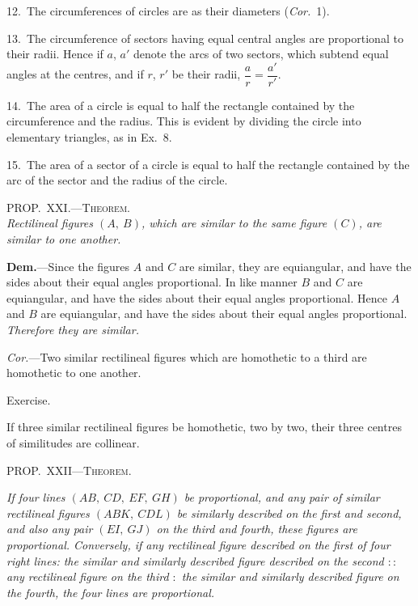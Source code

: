 \documentclass[oneside]{book}
\newcommand\myprop[2]{
\bigskip\Needspace*{4\baselineskip}\begin{center}\textsc{#1}\\\medskip\emph{#2}\par\end{center}
}
\newcommand\mypropl[2]{
\bigskip\Needspace*{4\baselineskip}\begin{center}\textsc{#1}\end{center}
\hspace{\parindent}\emph{#2}\par\medskip
}
\newcommand\exhead[1]{
\Needspace*{5\baselineskip}\begin{center}
\textsf{#1}
\end{center}
}
\newcommand\imgcent[2]{
\begin{center}
\end{center}
}
\begin{document}
\begin{footnotesize}
12.~The circumferences of circles are as their diameters
(\textit{Cor.}~1).

13.~The circumference of sectors having equal central angles
are proportional to their radii. Hence if $a$, $a'$ denote the arcs of
two sectors, which subtend equal angles at the centres, and if
$r$, $r'$ be their radii, $\dfrac{a}{r} = \dfrac{a'}{r'}$.

14.~The area of a circle is equal to half the rectangle contained
by the circumference and the radius. This is evident by
dividing the circle into elementary triangles, as in Ex.~8.

15.~The area of a sector of a circle is equal to half the rectangle
contained by the arc of the sector and the radius of the
circle.
\par\end{footnotesize}

\myprop{PROP\@.~XXI\@.---Theorem.}{Rectilineal figures $(A,\ B)$, which are similar to the same
figure $(C)$, are similar to one another.}

\textbf{Dem.}---Since the figures $A$ and $C$ are similar, they
are equiangular, and have the sides about their equal
angles proportional. In like manner $B$ and $C$ are
equiangular, and have the sides about their equal
angles proportional. Hence $A$ and $B$ are equiangular,
and have the sides about their equal angles proportional.
\emph{Therefore they are similar.}

\imgcent{230}{f202}

\textit{Cor.}---Two similar rectilineal figures which are homothetic
to a third are homothetic to one another.


\exhead{Exercise.}

\begin{footnotesize}
If three similar rectilineal figures be homothetic, two by two,
their three centres of similitudes are collinear.

\par\end{footnotesize}


\mypropl{PROP\@.~XXII---Theorem.}{If four lines $(AB,\ CD,\ EF,\ GH)$ be proportional, and
any pair of similar rectilineal figures $(ABK,\ CDL)$ be
similarly described on the first and second, and also any
pair $(EI,\ GJ)$ on the third and fourth, these figures are
proportional. \emph{Conversely}, if any rectilineal figure described
on the first of four right lines: the similar and
similarly described figure described on the second $::$ any
rectilineal figure on the third $:$ the similar and similarly
described figure on the fourth, the four lines are proportional.}
\end{document}
